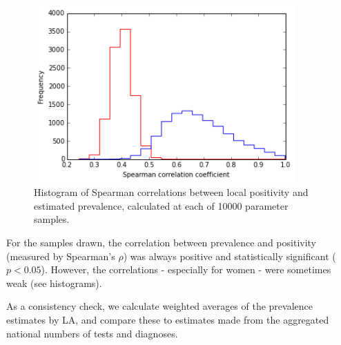 \documentclass{article}
\begin{document}
    \begin{figure}
        \begin{center}\includegraphics[width=10cm]{local_authorities_files/local_authorities_14_1.png}\end{center}
        \caption{Histogram of Spearman correlations between local positivity and estimated prevalence, calculated at each of 10000 parameter samples.}
        \label{}
    \end{figure}
    
    For the samples drawn, the correlation between prevalence and positivity
(measured by Spearman's \(\rho\)) was always positive and statistically
significant (\(p<0.05\)). However, the correlations - especially for
women - were sometimes weak (see histograms).

As a consistency check, we calculate weighted averages of the prevalence
estimates by LA, and compare these to estimates made from the aggregated
national numbers of tests and diagnoses.
\end{document}
